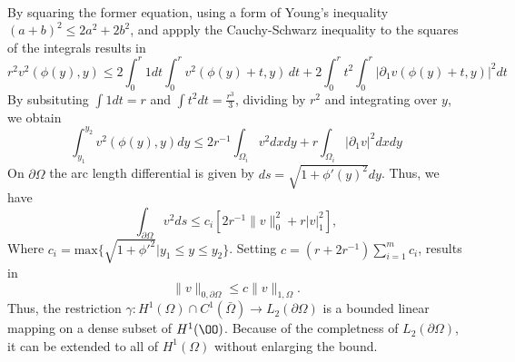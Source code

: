 \begin{bev}
\begin{align*}
    \end{align*}
    By squaring the former equation, using a form of Young's inequality ${(a+b)}^2 \leq 2a^2 + 2b^2$, and appply the Cauchy-Schwarz inequality to the squares of the integrals results in
    \begin{equation}
        r^2 v^2(\phi(y), y) \leq 2 \int_0^r 1 dt \int_0^r v^2(\phi(y) + t, y) \, dt +  2\int_0^r t^2 \int_0^r | \partial_1  v(\phi(y) + t, y) |^2 dt
    \end{equation}
    By subsituting $\int 1 dt = r$ and $\int t^2 dt = \frac{r^3}{3}$, dividing by $r^2$ and integrating over $y$, we obtain
    \begin{equation}
        \int_{y_1}^{y_2} v^2(\phi(y), y) dy \leq  2r^{-1} \int_{\Omega_i} v^2 dx dy + r \int_{\Omega_i} | \partial_1 v |^2 dx dy
    \end{equation} 
    On $\partial\Omega$ the arc length differential is given by $ds = \sqrt{1 + \phi'{(y)}^2} dy$. Thus, we have
    \begin{equation}
        \int_{\partial\Omega} v^2 ds \leq c_i \left[ 2r^{-1} \| v \|_0^2 + r | v |^2_1 \right],
    \end{equation}
    Where $c_i = \text{max}\{\sqrt{1+{\phi'}^2} | y_1 \leq y \leq y_2 \}$. Setting $c=(r+2r^{-1})\sum_{i=1}^m c_i$, results in
    \begin{equation}
        \| v \|_{0,\partial\Omega} \leq c \| v \|_{1,\Omega}.
    \end{equation}
    Thus, the restriction $\gamma : H^1(\Omega) \cap C^1(\bar{\Omega}) \to L_2(\partial \Omega)$ is a bounded linear mapping on a dense subset of $H^1(\OO)$. Because of the completness of $L_2(\partial \Omega)$, it can be extended to all of $H^1(\Omega)$ without enlarging the bound.
\end{bev}